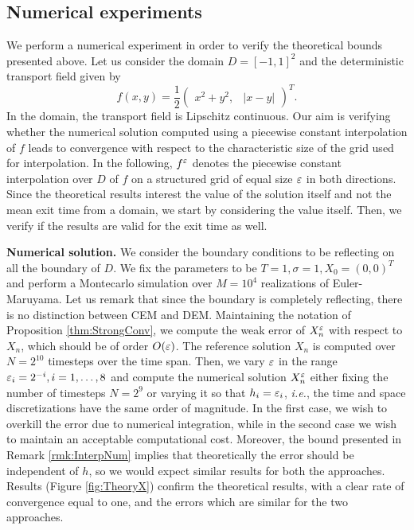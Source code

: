 \subsection{Numerical experiments}

We perform a numerical experiment in order to verify the theoretical bounds presented above. Let us consider the domain $D = [-1, 1]^2$ and the deterministic transport field given by
\begin{equation*}
	f(x, y) = \frac{1}{2} \begin{pmatrix} x^2 + y^2, & |x - y| \end{pmatrix}^T.
\end{equation*}
In the domain, the transport field is Lipschitz continuous. Our aim is verifying whether the numerical solution computed using a piecewise constant interpolation of $f$ leads to convergence with respect to the characteristic size of the grid used for interpolation. In the following, $f^\varepsilon$ denotes the piecewise constant interpolation over $D$ of $f$ on a structured grid of equal size $\varepsilon$ in both directions. Since the theoretical results interest the value of the solution itself and not the mean exit time from a domain, we start by considering the value itself. Then, we verify if the results are valid for the exit time as well.

\vspace{2mm}
\noindent \textbf{Numerical solution.} We consider the boundary conditions to be reflecting on all the boundary of $D$. We fix the parameters to be $T = 1, \sigma = 1, X_0 = (0, 0)^T$ and perform a Montecarlo simulation over $M = 10^4$ realizations of Euler-Maruyama. Let us remark that since the boundary is completely reflecting, there is no distinction between CEM and DEM. Maintaining the notation of Proposition \ref{thm:StrongConv}, we compute the weak error of $X_n^\varepsilon$ with respect to $X_n$, which should be of order $O(\varepsilon)$. The reference solution $X_n$ is computed over $N = 2^{10}$ timesteps over the time span. Then, we vary $\varepsilon$ in the range $\varepsilon_i = 2^{-i}, i = 1,\dots, 8$ and compute the numerical solution $X_n^\varepsilon$ either fixing the number of timesteps $N = 2^9$ or varying it so that $h_i = \varepsilon_i$, \textit{i.e.}, the time and space discretizations have the same order of magnitude. In the first case, we wish to overkill the error due to numerical integration, while in the second case we wish to maintain an acceptable computational cost. Moreover, the bound presented in Remark \ref{rmk:InterpNum} implies that theoretically the error should be independent of $h$, so we would expect similar results for both the approaches. Results (Figure \ref{fig:TheoryX}) confirm the theoretical results, with a clear rate of convergence equal to one, and the errors which are similar for the two approaches.

